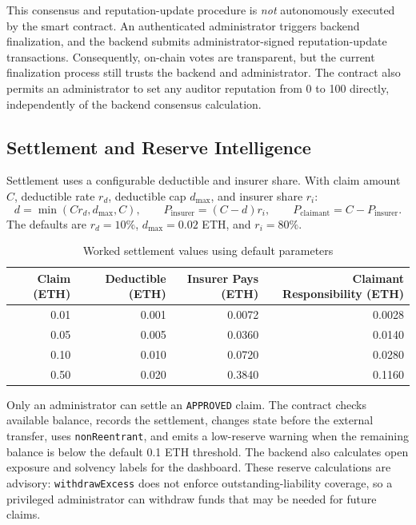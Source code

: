 This consensus and reputation-update procedure is \emph{not} autonomously
executed by the smart contract. An authenticated administrator triggers backend
finalization, and the backend submits administrator-signed reputation-update
transactions. Consequently, on-chain votes are transparent, but the current
finalization process still trusts the backend and administrator. The contract
also permits an administrator to set any auditor reputation from 0 to 100
directly, independently of the backend consensus calculation.

\subsection{Settlement and Reserve Intelligence}

Settlement uses a configurable deductible and insurer share. With claim amount
\(C\), deductible rate \(r_d\), deductible cap \(d_{\max}\), and insurer share
\(r_i\):
\begin{equation}
d=\min(Cr_d,d_{\max},C),
\qquad
P_{\mathrm{insurer}}=(C-d)r_i,
\qquad
P_{\mathrm{claimant}}=C-P_{\mathrm{insurer}}.
\label{eq:settlement_formula}
\end{equation}
The defaults are \(r_d=10\%\), \(d_{\max}=0.02\) ETH, and \(r_i=80\%\).

\begin{table}[htbp]
\centering
\caption{Worked settlement values using default parameters}
\label{tab:settlement_examples}
\begin{tabular}{|r|r|r|r|}
\hline
\textbf{Claim (ETH)} & \textbf{Deductible (ETH)} &
\textbf{Insurer Pays (ETH)} & \textbf{Claimant Responsibility (ETH)} \\
\hline
0.01 & 0.001 & 0.0072 & 0.0028 \\
\hline
0.05 & 0.005 & 0.0360 & 0.0140 \\
\hline
0.10 & 0.010 & 0.0720 & 0.0280 \\
\hline
0.50 & 0.020 & 0.3840 & 0.1160 \\
\hline
\end{tabular}
\end{table}

Only an administrator can settle an \texttt{APPROVED} claim. The contract
checks available balance, records the settlement, changes state before the
external transfer, uses \texttt{nonReentrant}, and emits a low-reserve warning
when the remaining balance is below the default 0.1 ETH threshold. The backend
also calculates open exposure and solvency labels for the dashboard. These
reserve calculations are advisory: \texttt{withdrawExcess} does not enforce
outstanding-liability coverage, so a privileged administrator can withdraw
funds that may be needed for future claims.

